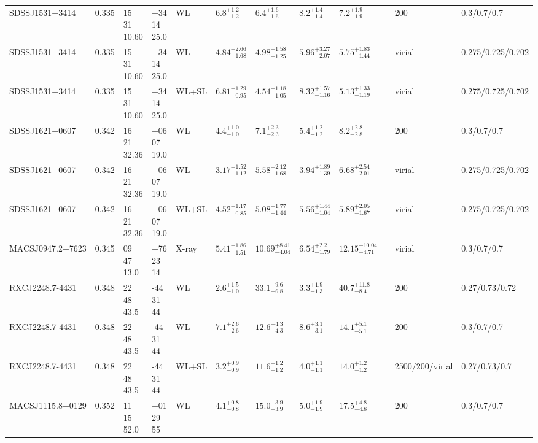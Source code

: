 \begin{landscape}
\begin{center}
{\begin{longtable}{llllllllllll}
SDSSJ1531+3414 & 0.335 & 15 31 10.60 & +34 14 25.0 & WL & ${6.8}^{+1.2}_{-1.2}$ & ${6.4}^{+1.6}_{-1.6}$ & ${8.2}^{+1.4}_{-1.4}$ & ${7.2}^{+1.9}_{-1.9}$ & \citet{SE14.1} & 200 & 0.3/0.7/0.7 \\
SDSSJ1531+3414 & 0.335 & 15 31 10.60 & +34 14 25.0 & WL & ${4.84}^{+2.66}_{-1.68}$ & ${4.98}^{+1.58}_{-1.25}$ & ${5.96}^{+3.27}_{-2.07}$ & ${5.75}^{+1.83}_{-1.44}$ & \citet{OG12.1} & virial & 0.275/0.725/0.702 \\
SDSSJ1531+3414 & 0.335 & 15 31 10.60 & +34 14 25.0 & WL+SL & ${6.81}^{+1.29}_{-0.95}$ & ${4.54}^{+1.18}_{-1.05}$ & ${8.32}^{+1.57}_{-1.16}$ & ${5.13}^{+1.33}_{-1.19}$ & \citet{OG12.1} & virial & 0.275/0.725/0.702 \\
SDSSJ1621+0607 & 0.342 & 16 21 32.36 & +06 07 19.0 & WL & ${4.4}^{+1.0}_{-1.0}$ & ${7.1}^{+2.3}_{-2.3}$ & ${5.4}^{+1.2}_{-1.2}$ & ${8.2}^{+2.8}_{-2.8}$ & \citet{SE14.1} & 200 & 0.3/0.7/0.7 \\
SDSSJ1621+0607 & 0.342 & 16 21 32.36 & +06 07 19.0 & WL & ${3.17}^{+1.52}_{-1.12}$ & ${5.58}^{+2.12}_{-1.68}$ & ${3.94}^{+1.89}_{-1.39}$ & ${6.68}^{+2.54}_{-2.01}$ & \citet{OG12.1} & virial & 0.275/0.725/0.702 \\
SDSSJ1621+0607 & 0.342 & 16 21 32.36 & +06 07 19.0 & WL+SL & ${4.52}^{+1.17}_{-0.85}$ & ${5.08}^{+1.77}_{-1.44}$ & ${5.56}^{+1.44}_{-1.04}$ & ${5.89}^{+2.05}_{-1.67}$ & \citet{OG12.1} & virial & 0.275/0.725/0.702 \\
MACSJ0947.2+7623 & 0.345 & 09 47 13.0 & +76 23 14 & X-ray & ${5.41}^{+1.86}_{-1.51}$ & ${10.69}^{+8.41}_{-4.04}$ & ${6.54}^{+2.2}_{-1.79}$ & ${12.15}^{+10.04}_{-4.71}$ & \citet{SC07.1} & virial & 0.3/0.7/0.7 \\
RXCJ2248.7-4431 & 0.348 & 22 48 43.5 & -44 31 44 & WL & ${2.6}^{+1.5}_{-1.0}$ & ${33.1}^{+9.6}_{-6.8}$ & ${3.3}^{+1.9}_{-1.3}$ & ${40.7}^{+11.8}_{-8.4}$ & \citet{GR13.1} & 200 & 0.27/0.73/0.72 \\
RXCJ2248.7-4431 & 0.348 & 22 48 43.5 & -44 31 44 & WL & ${7.1}^{+2.6}_{-2.6}$ & ${12.6}^{+4.3}_{-4.3}$ & ${8.6}^{+3.1}_{-3.1}$ & ${14.1}^{+5.1}_{-5.1}$ & \citet{SE14.1} & 200 & 0.3/0.7/0.7 \\
RXCJ2248.7-4431 & 0.348 & 22 48 43.5 & -44 31 44 & WL+SL & ${3.2}^{+0.9}_{-0.9}$ & ${11.6}^{+1.2}_{-1.2}$ & ${4.0}^{+1.1}_{-1.1}$ & ${14.0}^{+1.2}_{-1.2}$ & \citet{ME14.1} & 2500/200/virial & 0.27/0.73/0.7 \\
MACSJ1115.8+0129 & 0.352 & 11 15 52.0 & +01 29 55 & WL & ${4.1}^{+0.8}_{-0.8}$ & ${15.0}^{+3.9}_{-3.9}$ & ${5.0}^{+1.9}_{-1.9}$ & ${17.5}^{+4.8}_{-4.8}$ & \citet{SE14.1} & 200 & 0.3/0.7/0.7 \\

\end{longtable}}
\end{center}
\end{landscape}

